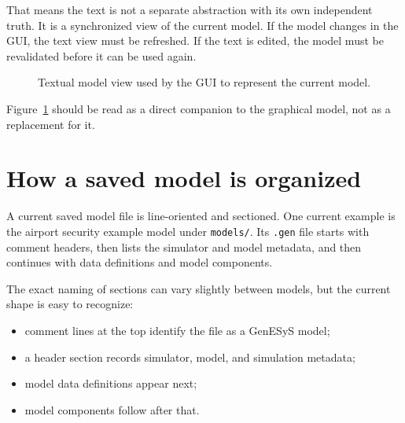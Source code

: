 That means the text is not a separate abstraction with its own independent
truth. It is a synchronized view of the current model. If the model changes in
the GUI, the text view must be refreshed. If the text is edited, the model must
be revalidated before it can be used again.

\begin{figure}[htbp]
\centering
\caption{Textual model view used by the GUI to represent the current model.}
\label{fig:model-language-tab}
\end{figure}

Figure~\ref{fig:model-language-tab} should be read as a direct companion to the
graphical model, not as a replacement for it.

\section{How a saved model is organized}
\label{sec:model-language-organization}

A current saved model file is line-oriented and sectioned. One current example
is the airport security example model under \texttt{models/}. Its
\texttt{.gen} file starts with comment headers, then lists the simulator and
model metadata, and then continues with data definitions and model components.

The exact naming of sections can vary slightly between models, but the current
shape is easy to recognize:
\begin{itemize}
\item comment lines at the top identify the file as a GenESyS model;
\item a header section records simulator, model, and simulation metadata;
\item model data definitions appear next;
\item model components follow after that.
\end{itemize}

